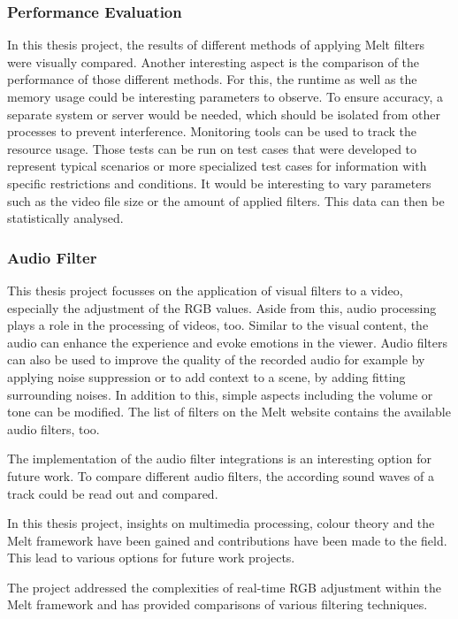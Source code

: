 \documentclass[../MasterThesis.tex]{subfiles}
\begin{document}
\subsubsection*{Performance Evaluation}


In this thesis project, the results of different methods of applying Melt filters were visually compared. Another interesting aspect is the comparison of the performance of those different methods. For this, the runtime as well as the memory usage could be interesting parameters to observe. 
To ensure accuracy, a separate system or server would be needed, which should be isolated from other processes to prevent interference. Monitoring tools can be used to track the resource usage. 
Those tests can be run on test cases that were developed to represent typical scenarios or more specialized test cases for information with specific restrictions and conditions.
It would be interesting to vary parameters such as the video file size or the amount of applied filters.
This data can then be statistically analysed.












\subsubsection*{Audio Filter}

This thesis project focusses on the application of visual filters to a video, especially the adjustment of the RGB values. Aside from this, audio processing plays a role in the processing of videos, too. Similar to the visual content, the audio can enhance the experience and evoke emotions in the viewer. Audio filters can also be used to improve the quality of the recorded audio for example by applying noise suppression or to add context to a scene, by adding fitting surrounding noises. In addition to this, simple aspects including the volume or tone can be modified.
The list of filters on the Melt website contains the available audio filters, too.~\cite{melt}

The implementation of the audio filter integrations is an interesting option for future work. To compare different audio filters, the according sound waves of a track could be read out and compared.




In this thesis project, insights on multimedia processing, colour theory and the Melt framework have been gained and contributions have been made to the field. This lead to various options for future work projects.

The project addressed the complexities of real-time RGB adjustment within the Melt framework and has provided comparisons of various filtering techniques. 






	
	
\end{document}
